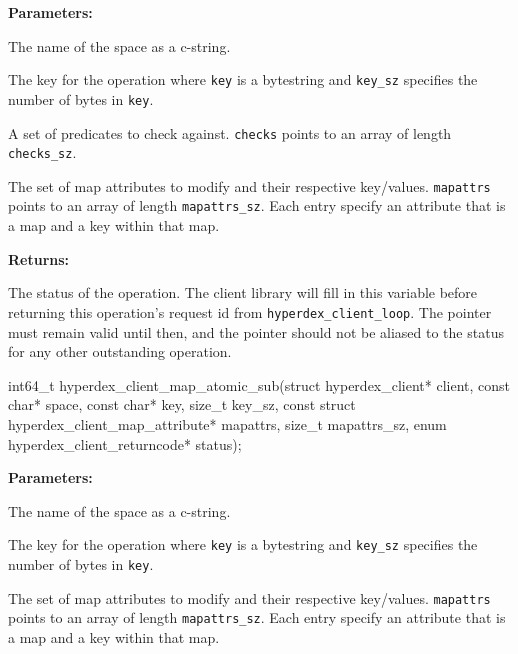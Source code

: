 \noindent\textbf{Parameters:}
\begin{description}[labelindent=\widthof{{\texttt{mapattrs}, \texttt{mapattrs\_sz}}},leftmargin=*,noitemsep,nolistsep,align=right]
\item[\texttt{space}] The name of the space as a c-string.
\item[\texttt{key}, \texttt{key\_sz}] The key for the operation where \texttt{key} is a bytestring and \texttt{key\_sz} specifies the number of bytes in \texttt{key}.
\item[\texttt{checks}, \texttt{checks\_sz}] A set of predicates to check against.  \texttt{checks} points to an array of length \texttt{checks\_sz}.
\item[\texttt{mapattrs}, \texttt{mapattrs\_sz}] The set of map attributes to modify and their respective key/values.  \texttt{mapattrs} points to an array of length \texttt{mapattrs\_sz}.  Each entry specify an attribute that is a map and a key within that map.
\end{description}

\noindent\textbf{Returns:}
\begin{description}[labelindent=\widthof{{\texttt{status}}},leftmargin=*,noitemsep,nolistsep,align=right]
\item[\texttt{status}] The status of the operation.  The client library will fill in this variable before returning this operation's request id from \texttt{hyperdex\_client\_loop}.  The pointer must remain valid until then, and the pointer should not be aliased to the status for any other outstanding operation.
\end{description}

\funcsep
{}
\begin{ccode}
int64_t hyperdex_client_map_atomic_sub(struct hyperdex_client* client,
                const char* space,
                const char* key, size_t key_sz,
                const struct hyperdex_client_map_attribute* mapattrs, size_t mapattrs_sz,
                enum hyperdex_client_returncode* status);
\end{ccode}
\funcdesc 

\noindent\textbf{Parameters:}
\begin{description}[labelindent=\widthof{{\texttt{mapattrs}, \texttt{mapattrs\_sz}}},leftmargin=*,noitemsep,nolistsep,align=right]
\item[\texttt{space}] The name of the space as a c-string.
\item[\texttt{key}, \texttt{key\_sz}] The key for the operation where \texttt{key} is a bytestring and \texttt{key\_sz} specifies the number of bytes in \texttt{key}.
\item[\texttt{mapattrs}, \texttt{mapattrs\_sz}] The set of map attributes to modify and their respective key/values.  \texttt{mapattrs} points to an array of length \texttt{mapattrs\_sz}.  Each entry specify an attribute that is a map and a key within that map.
\end{description}

